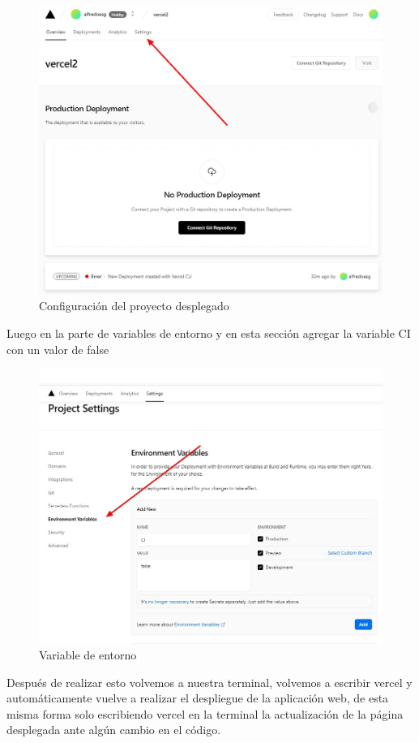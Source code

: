 \documentclass[12pt, a4paper, titlepage]{article}
\begin{document}
	\begin{figure}[H]
		\includegraphics[width=12cm]{./Imagenes/Despliegue/Ajustes.jpeg}
		\centering 
		\caption{Configuración del proyecto desplegado}
	\end{figure}
	Luego en la parte de variables de entorno y en esta sección agregar la variable CI con un valor de false
	\begin{figure}[H]
		\includegraphics[width=12cm]{./Imagenes/Despliegue/Varaiblesentorno.jpeg}
		\centering 
		\caption{Variable de entorno}
	\end{figure}
	Después de realizar esto volvemos a nuestra terminal, volvemos a escribir vercel y automáticamente vuelve a realizar el despliegue de la aplicación web, de esta misma forma solo escribiendo vercel en la terminal la actualización de la página desplegada ante algún cambio en el código.\\\\
\end{document}
